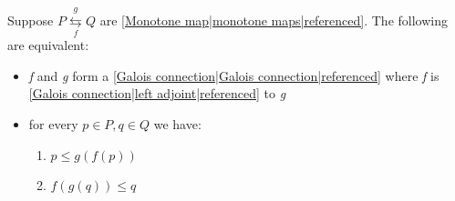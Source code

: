 

Suppose $P \overset{g}{\underset{f}{\leftrightarrows}} Q$ are \ref{Monotone map|monotone maps|referenced}. The following are equivalent:
    \begin{itemize}
      \item \emph{f} and \emph{g} form a \ref{Galois connection|Galois connection|referenced} where \emph{f} is \ref{Galois connection|left adjoint|referenced} to \emph{g}
      \item for every $p \in P, q \in Q$ we have:
            \begin{enumerate}
              \item $p \leq g(f(p))$
              \item $f(g(q)) \leq q$
            \end{enumerate}

    \end{itemize}